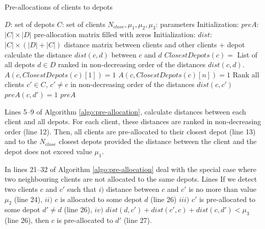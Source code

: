 \documentclass[10pt, a4paper]{article}
\begin{document}
\begin{algorithm}
	\caption{Pre-allocations of clients to depots}
	\label{algo:pre-allocation}
	\begin{algorithmic}[1]
		\REQUIRE  $D$: set of depots
		\REQUIRE $C$: set of clients
		\REQUIRE $N_{close}, \mu_1, \mu_2, \mu_3$: parameters 
		\STATE
		\STATE Initialization: $preA$: $|C| \times |D|$ pre-allocation matrix filled with zeros
		\STATE Initialization: $dist$: $|C|\times (|D|+|C|)$ distance matrix between clients and other clients + depot
		\STATE
				\STATE calculate the distance $dist(c,d)$ between $c$ and $d$
			\ENDFOR
		\ENDFOR
		\STATE
			\STATE $ClosestDepots(c) = $ List of all depots $d \in D$ ranked in non-decreasing order of the distances $dist(c,d)$.
			\STATE 	$A(c,ClosestDepots(c)[1]) =1$ 	
					\STATE 	$A(c,ClosestDepots(c)[n]) =1$ 	
				\ENDIF
			\ENDFOR
		\ENDFOR
		\STATE
			\STATE Rank all clients $c' \in C$, $c' \neq c$ in non-decreasing order of the distances $dist(c,c')$ 
							\STATE $preA(c,d') =1$
						\ENDIF
					\ENDFOR
				\ENDIF
			\ENDFOR
		\ENDFOR
		\RETURN $preA$
	\end{algorithmic}
\end{algorithm}


Lines 5--9 of Algorithm \ref{algo:pre-allocation}, calculate distances between each client and all depots. For each client, these distances are ranked in non-decreasing order (line 12). Then, all clients are pre-allocated to their closest depot (line 13) and to 
the $N_{close}$ closest depots provided the distance between the client and the depot does not exceed value $\mu_1$. 

In lines 21--32 of Algorithm \ref{algo:pre-allocation} deal with the special case where two neighbouring clients are not allocated to the same depots. 
Lines If we detect two clients $c$ and $c'$ such that 
$i)$ distance between $c$ and $c'$ is no more than value $\mu_2$ (line 24), 
$ii)$ $c$ is allocated to some depot $d$ (line 26)
$iii)$ $c'$ is pre-allocated to some depot $d' \ne d$ (line 26),
$iv)$ $dist(d,c')+dist(c',c)+dist(c,d') < \mu_3$ (line 26),  
then $c$ is pre-allocated to $d'$ (line 27).  
\end{document}
